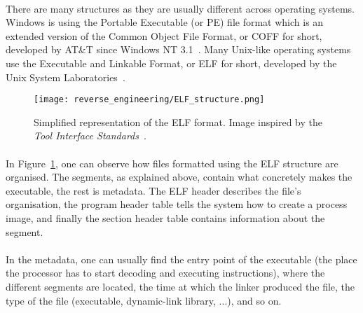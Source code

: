 \paragraph{}
There are many structures as they are usually different across operating systems. Windows is using the Portable Executable (or PE) file format which is an extended version of the Common Object File Format, or COFF for short, developed by AT\&T since Windows NT 3.1~\cite{pe_win32}. Many Unix-like operating systems use the Executable and Linkable Format, or ELF for short, developed by the Unix System Laboratories~\cite{tis1995tool}.

\begin{figure}[!htb]
	\centering
	\texttt{[image: reverse\_engineering/ELF\_structure.png]}
	\caption{Simplified representation of the ELF format. Image inspired by the \textit{Tool Interface Standards}~\cite{tis1995tool}.}
	\label{fig:ELF_format}
\end{figure}

\paragraph{}
In Figure~\ref{fig:ELF_format}, one can observe how files formatted using the ELF structure are organised. The segments, as explained above, contain what concretely makes the executable, the rest is metadata. The ELF header describes the file's organisation, the program header table tells the system how to create a process image, and finally the section header table contains information about the segment.

\paragraph{}
In the metadata, one can usually find the entry point of the executable (the place the processor has to start decoding and executing instructions), where the different segments are located, the time at which the linker produced the file, the type of the file (executable, dynamic-link library, ...), and so on.

